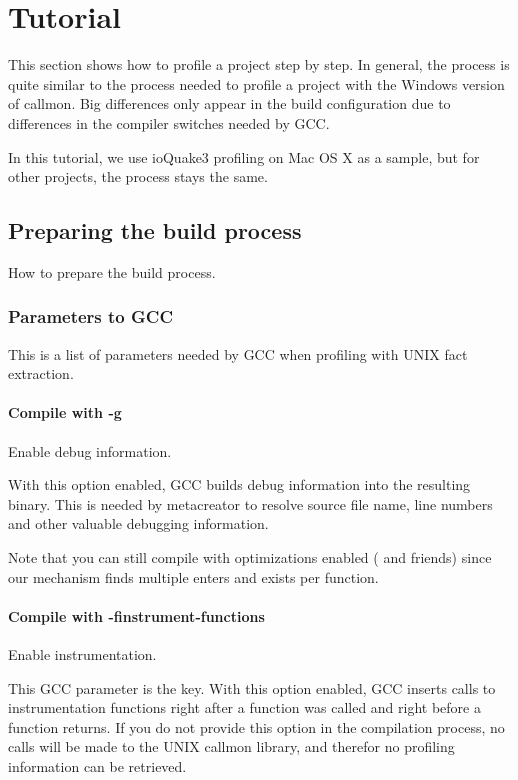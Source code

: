 
\section{Tutorial}
\label{sec:Tutorial}

This section shows how to profile a project step by step. In general, the process is quite similar to the process needed to profile a project with the Windows version of callmon. Big differences only appear in the build configuration due to differences in the compiler switches needed by GCC.

In this tutorial, we use ioQuake3 profiling on Mac OS X as a sample, but for other projects, the process stays the same.

\subsection{Preparing the build process} How to prepare the build process.

\subsubsection{Parameters to GCC} This is a list of parameters needed by GCC when profiling with UNIX fact extraction.

\paragraph{Compile with -g} Enable debug information.

With this option enabled, GCC builds debug information into the resulting binary. This is needed by metacreator to resolve source file name, line numbers and other valuable debugging information.

Note that you can still compile with optimizations enabled ( and friends) since our mechanism finds multiple enters and exists per function.

\paragraph{Compile with -finstrument-functions} Enable instrumentation.

This GCC parameter is the key. With this option enabled, GCC inserts calls to instrumentation functions right after a function was called and right before a function returns. If you do not provide this option in the compilation process, no calls will be made to the UNIX callmon library, and therefor no profiling information can be retrieved.

